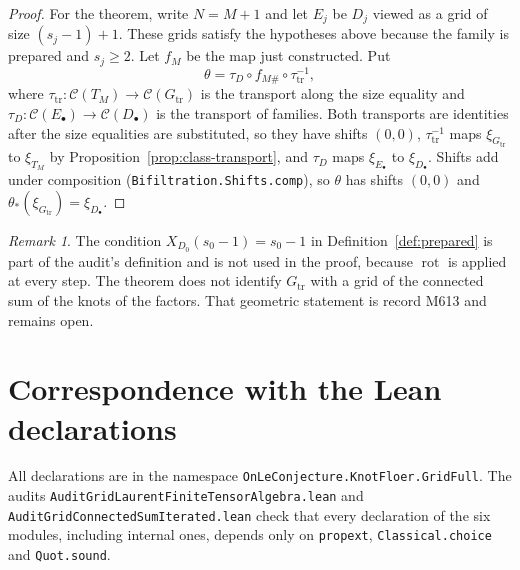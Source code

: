 \documentclass[11pt]{amsart}
\theoremstyle{definition}
\theoremstyle{remark}
\newtheorem{remark}[theorem]{Remark}
\newcommand{\lean}[1]{\textnormal{\nolinkurl{#1}}}
\newcommand{\cC}{\mathcal{C}}
\newcommand{\rot}{\operatorname{rot}}
\begin{document}
\begin{proof}
For the theorem, write $N=M+1$ and let $E_j$ be $D_j$ viewed as a grid of size $(s_j-1)+1$. These
grids satisfy the hypotheses above because the family is prepared and $s_j\ge2$. Let $f_M$ be the
map just constructed. Put
\[
\theta=\tau_D\circ f_{M\#}\circ\tau_{\mathrm{tr}}^{-1},
\]
where $\tau_{\mathrm{tr}}\colon\cC(T_M)\to\cC(G_{\mathrm{tr}})$ is the transport along the size
equality and $\tau_D\colon\cC(E_\bullet)\to\cC(D_\bullet)$ is the transport of families. Both
transports are identities after the size equalities are substituted, so they have shifts $(0,0)$,
$\tau_{\mathrm{tr}}^{-1}$ maps $\xi_{G_{\mathrm{tr}}}$ to $\xi_{T_M}$ by
Proposition~\ref{prop:class-transport}, and $\tau_D$ maps $\xi_{E_\bullet}$ to $\xi_{D_\bullet}$.
Shifts add under composition (\lean{Bifiltration.Shifts.comp}), so $\theta$ has shifts $(0,0)$ and
$\theta_*(\xi_{G_{\mathrm{tr}}})=\xi_{D_\bullet}$.
\end{proof}

\begin{remark}
The condition $X_{D_0}(s_0-1)=s_0-1$ in Definition~\ref{def:prepared} is part of the audit's
definition and is not used in the proof, because $\rot$ is applied at every step. The theorem does
not identify $G_{\mathrm{tr}}$ with a grid of the connected sum of the knots of the factors. That
geometric statement is record M613 and remains open.
\end{remark}

\section{Correspondence with the Lean declarations}\label{sec:lean}

All declarations are in the namespace \lean{OnLeConjecture.KnotFloer.GridFull}. The audits
\lean{AuditGridLaurentFiniteTensorAlgebra.lean} and \lean{AuditGridConnectedSumIterated.lean}
check that every declaration of the six modules, including internal ones, depends only on
\lean{propext}, \lean{Classical.choice} and \lean{Quot.sound}.
\end{document}
